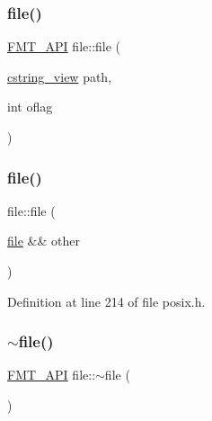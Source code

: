 \mbox{\label{classfile_a26bc3b2f162d44e6689757e35396c61c}} 
\subsubsection{\texorpdfstring{file()}{file()}\hspace{0.1cm}{\footnotesize\ttfamily [2/3]}}
{\footnotesize\ttfamily \hyperlink{core_8h_a9a4960b70582ed2620911a0b75dce0b5}{F\+M\+T\+\_\+\+A\+PI} file\+::file (\begin{DoxyParamCaption}\item[{\hyperlink{posix_8h_ae8eb4eb4ba15f0c8755e1d5c8e7c07d9}{cstring\+\_\+view}}]{path,  }\item[{int}]{oflag }\end{DoxyParamCaption})}

\mbox{\label{classfile_a12ab9fbce2297a5839c1d0b3159be261}} 
\subsubsection{\texorpdfstring{file()}{file()}\hspace{0.1cm}{\footnotesize\ttfamily [3/3]}}
{\footnotesize\ttfamily file\+::file (\begin{DoxyParamCaption}\item[{\hyperlink{classfile}{file} \&\&}]{other }\end{DoxyParamCaption})\hspace{0.3cm}{\ttfamily [inline]}}



Definition at line 214 of file posix.\+h.

\mbox{\label{classfile_ab18abda35e187845274e67782840b683}} 
\subsubsection{\texorpdfstring{$\sim$file()}{~file()}}
{\footnotesize\ttfamily \hyperlink{core_8h_a9a4960b70582ed2620911a0b75dce0b5}{F\+M\+T\+\_\+\+A\+PI} file\+::$\sim$file (\begin{DoxyParamCaption}{ }\end{DoxyParamCaption})}



